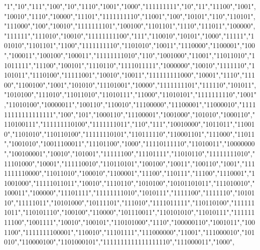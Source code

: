 "1","10","111","100","10","1110","1001","1000","111111111","10","11","11100","1001","10010","1110","10000","11101","1111111110","11001","100","10101","110","110101","111000","100","10010","1111111101","100100","1101101","1110","111011","100000","111111","111010","10010","11111111100","111","110010","10101","1000","11111","101010","1101101","1100","1111111110","1101010","10011","1110000","1100001","100","100011","100100","100011","11111111010","110","1001000","11001","11011010","11011111","11100","100101","1110110","1111011111","1000000","10010","1111110","1101011","1110100","11111001","10010","10011","111111111000","10001","1110","11100","1100100","1001","101010","11101001","10000","1111111101","111110","101011","1010100","111010","11011010","11010111","11000","11010101","1111111110","1001","11010100","10000011","100110","110010","11100000","11100001","11000010","111111111111111111","100","101","1000110","11100001","1001000","101010","1000110","110100111","111111110100","1111111011","110","111","10010000","1011011","110010","1101010","110110100","11111110101","110111110","110001101","111000","11011","1001010","10011100011","11101100","1000","11110111110","11010011","10000000","100100001","10010","101001","11111100","11101111","11010110","11111111010","11101000","10001","111110010","110110101","100100","10011","100110","1001","1111111110000","11011010","100010","1100001","11100","110111","11100","1110001","11001000","11111011011","10010","1110110","1010100","10101101011","111010010","100011","100000","11101111","11111111010","1010111","1111100","1111110","1010110","11111011","10101000","10111101","111010","1111011111","110110100","1111111011","110101110","100100","110000","101110011","110101010","11010111","11111111100","1001111","10010","100101","110101000","1110","100000110","1001011","1001100","1111111100001","110010","11101111","111000000","11001","111000010","101010","110000100","1101000101","1111111111111111110","111000011","1000",